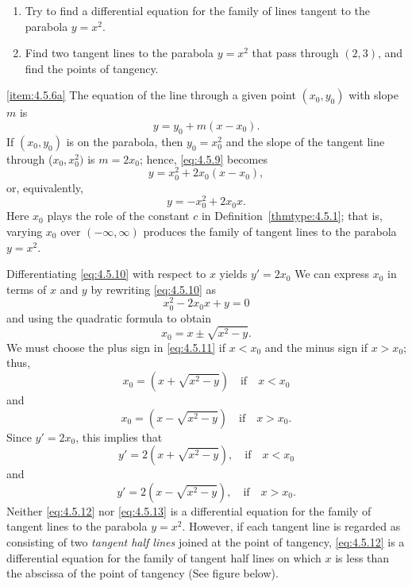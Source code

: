 \documentclass{ximera}
\begin{document}
\begin{example}\label{example:4.5.6}
 
\begin{enumerate}
\item\label{item:4.5.6a} %
Try to find a differential equation for the family of lines tangent
to the parabola $y=x^2$.
 
\item\label{item:4.5.6b} %
Find two tangent lines to  the parabola $y=x^2$ that pass
through $(2,3)$, and find the points of tangency.
\end{enumerate}
 
 
\begin{explanation} \ref{item:4.5.6a} The equation of the line through a given point
$(x_0,y_0)$ with slope $m$ is
\begin{equation}  \label{eq:4.5.9}
y=y_0+m(x-x_0).
\end{equation}
If $(x_0,y_0)$ is on the parabola, then $y_0=x_0^2$ and the slope of
the tangent line through ($x_0,x_0^2)$ is $m=2x_0$; hence,
\eqref{eq:4.5.9} becomes
$$
y=x_0^2+2x_0(x-x_0),
$$
 or, equivalently,
\begin{equation} \label{eq:4.5.10}
y=-x_0^2+2x_0x.
\end{equation}
Here $x_0$ plays the role of the constant $c$ in
Definition~\ref{thmtype:4.5.1}; that is, varying $x_0$ over
$(-\infty,\infty)$ produces the family of tangent lines to the
parabola $y=x^2$.
 
 
Differentiating \eqref{eq:4.5.10} with respect to $x$ yields
$y'=2x_0$
We can express $x_0$ in terms of $x$ and $y$ by rewriting
\eqref{eq:4.5.10} as
$$
x_0^2-2x_0x+y=0
$$
and using the quadratic formula to obtain
 \begin{equation}\label{eq:4.5.11}
 x_0=x\pm\sqrt{x^2-y}.
\end{equation}
We must choose the plus sign in \eqref{eq:4.5.11} if $x<x_0$
and the minus sign if $x>x_0$;   thus,
$$
x_0=\left(x+\sqrt{x^2-y}\right)\quad\mbox{if}\quad x<x_0
$$
 and
$$
x_0=\left(x-\sqrt{x^2-y}\right)\quad\mbox{if}\quad x>x_0.
$$
Since $y'=2x_0$, this implies that
\begin{equation} \label{eq:4.5.12}
y'=2\left(x+\sqrt{x^2-y}\right),\quad\mbox{if}\quad x<x_0
\end{equation}
 and
\begin{equation} \label{eq:4.5.13}
y'=2\left(x-\sqrt{x^2-y}\right),\quad \mbox{if}\quad x>x_0.
\end{equation}
Neither \eqref{eq:4.5.12} nor \eqref{eq:4.5.13} is a differential equation for
the family of tangent lines to the parabola $y=x^2$. However, if each
tangent line is regarded as consisting of two \textit{tangent half
lines} joined at the point of tangency,   \eqref{eq:4.5.12} is a
differential equation for the family of tangent half lines on which
$x$ is less than the abscissa of the point of tangency
(See figure below).


\end{explanation}
\end{example}
\end{document}
